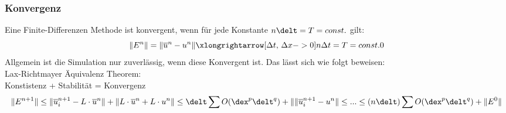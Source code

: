 \subsubsection{Konvergenz}
Eine Finite-Differenzen Methode ist konvergent, wenn f\"ur jede Konstante $n\delt = T = const.$ gilt:
\begin{equation*}
	\|E^n\| = \|\overline{u}^n - u^n\| \xlongrightarrow[\text{$\Delta$} t \text{, $\Delta$}x -> 0]{n\text{$\Delta$}t = T = const.} 0
\end{equation*}
Allgemein ist die Simulation nur zuverl\"assig, wenn diese Konvergent ist. Das l\"asst sich wie folgt beweisen:\\
Lax-Richtmayer \"Aquivalenz Theorem:\\
Konstistenz + Stabilit\"at = Konvergenz
\begin{equation*}
	\|E^{n+1}\| \leq \|\overline{u}^{n+1}_i - L\cdot \overline{u}^n\| + \|L\cdot \overline{u}^n + L\cdot u^n\| \leq \delt \sum O(\dex^p\delt^q) + \|\|\overline{u}^{n+1}_i - u^n\| \leq ... \leq (n\delt) \sum O(\dex^p\delt^q) + \|E^0\|
\end{equation*}
\par
\vspace{-2em}

